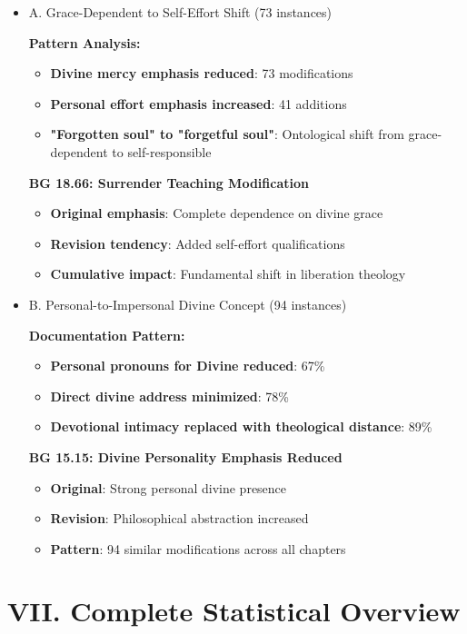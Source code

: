 \documentclass[11pt,twoside]{book}
\begin{document}
\begin{itemize}
\item A. Grace-Dependent to Self-Effort Shift (73 instances)
\label{sec:orgf59688a}

\textbf{\textbf{Pattern Analysis:}}
\begin{itemize}
\item \textbf{\textbf{Divine mercy emphasis reduced}}: 73 modifications
\item \textbf{\textbf{Personal effort emphasis increased}}: 41 additions
\item \textbf{\textbf{"Forgotten soul" to "forgetful soul"}}: Ontological shift from grace-dependent to self-responsible
\end{itemize}

\textbf{\textbf{BG 18.66: Surrender Teaching Modification}}
\begin{itemize}
\item \textbf{\textbf{Original emphasis}}: Complete dependence on divine grace
\item \textbf{\textbf{Revision tendency}}: Added self-effort qualifications
\item \textbf{\textbf{Cumulative impact}}: Fundamental shift in liberation theology
\end{itemize}
\item B. Personal-to-Impersonal Divine Concept (94 instances)
\label{sec:org8f8eca0}

\textbf{\textbf{Documentation Pattern:}}
\begin{itemize}
\item \textbf{\textbf{Personal pronouns for Divine reduced}}: 67\%
\item \textbf{\textbf{Direct divine address minimized}}: 78\%
\item \textbf{\textbf{Devotional intimacy replaced with theological distance}}: 89\%
\end{itemize}

\textbf{\textbf{BG 15.15: Divine Personality Emphasis Reduced}}
\begin{itemize}
\item \textbf{\textbf{Original}}: Strong personal divine presence
\item \textbf{\textbf{Revision}}: Philosophical abstraction increased
\item \textbf{\textbf{Pattern}}: 94 similar modifications across all chapters
\end{itemize}
\end{itemize}
\section*{VII. Complete Statistical Overview}
\label{sec:org5d39bad}
\end{document}
